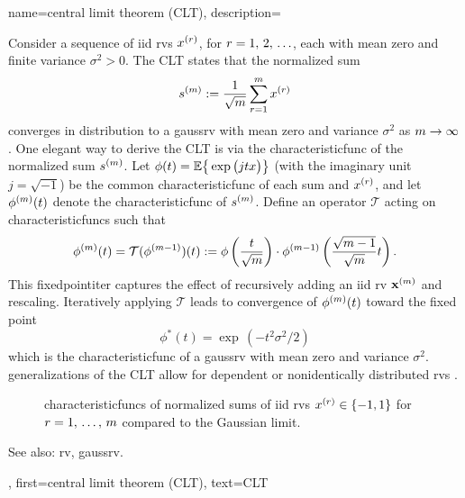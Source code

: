 {name={central limit theorem (CLT)},
	description={Consider a sequence of \gls{iid} \glspl{rv} \( x^{(r)} \), for \( r = 1, \,2, \,\ldots \), 
		each with \gls{mean} zero and finite \gls{variance} \( \sigma^2 > 0 \). 
		The  CLT states that the normalized sum 
		\[
		s^{(m)} := \frac{1}{\sqrt{m}} \sum_{r = 1}^{m} x^{(r)} 
		\]
		converges in distribution to a \gls{gaussrv} with \gls{mean} zero and \gls{variance} \( \sigma^2 \) as \( m \to \infty \) \cite[Proposition~2.17]{AsympVanderVaartBook}.
		One elegant way to derive the CLT is via the \gls{characteristicfunc} of the normalized sum \( s^{(m)} \). 
		Let $ \phi(t) = \mathbb{E} \big\{ \exp \big( j t x \big) \big\}$ (with the imaginary unit $j = \sqrt{-1}$) 
		be the common \gls{characteristicfunc} of each sum and $x^{(r)}$, and let \( \phi^{(m)}(t) \) 
		denote the \gls{characteristicfunc} of \( s^{(m)} \). Define an operator \( \mathcal{T} \) acting on \glspl{characteristicfunc} 
		such that
		\[
		\phi^{(m)}(t) = \mathcal{T}(\phi^{(m-1)})(t) := \phi\left( \frac{t}{\sqrt{m}} \right) \cdot \phi^{(m-1)}\left( \frac{\sqrt{m-1}}{\sqrt{m}} t \right).
		\]
		This \gls{fixedpointiter} captures the effect of recursively adding an \gls{iid} \gls{rv} ${\bf x}^{(m)}$ 
		and rescaling. Iteratively applying \( \mathcal{T} \) leads to convergence of \( \phi^{(m)}(t) \) toward the fixed point
		\[
		\phi^*(t) = \exp\,(-t^2 \sigma^2 / 2)
		\]
		which is the \gls{characteristicfunc} of a \gls{gaussrv} with \gls{mean} zero and \gls{variance} 
		\( \sigma^2 \). \Glspl{generalization} of the CLT allow for dependent or nonidentically distributed \glspl{rv} \cite[Sec.~2.8]{AsympVanderVaartBook}.
		\begin{figure}[H]
			\centering
			\caption{\Glspl{characteristicfunc} of normalized sums of \gls{iid} \glspl{rv} $x^{(r)} \in \{-1,1\}$ 
			for $r=1,\,\ldots,\,m$ compared to the Gaussian limit.}
		\end{figure}
		See also: \gls{rv}, \gls{gaussrv}.},
	first={central limit theorem (CLT)},
	text={CLT}
}


